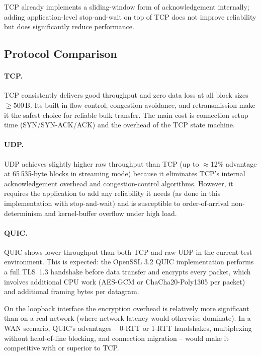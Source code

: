 \documentclass[12pt,a4paper]{article}
\begin{document}
TCP already implements a sliding-window form of acknowledgement internally;
adding application-level stop-and-wait on top of TCP does not improve
reliability but does significantly reduce performance.

\subsection{Protocol Comparison}

\paragraph{TCP.}
TCP consistently delivers good throughput and zero data loss at all block
sizes $\geq 500$\,B.  Its built-in flow control, congestion avoidance, and
retransmission make it the safest choice for reliable bulk transfer.
The main cost is connection setup time (SYN/SYN-ACK/ACK) and the overhead
of the TCP state machine.

\paragraph{UDP.}
UDP achieves slightly higher raw throughput than TCP (up to $\approx$12\%
advantage at 65\,535-byte blocks in streaming mode) because it eliminates
TCP's internal acknowledgement overhead and congestion-control algorithms.
However, it requires the application to add any reliability it needs (as done
in this implementation with stop-and-wait) and is susceptible to
order-of-arrival non-determinism and kernel-buffer overflow under high load.

\paragraph{QUIC.}
QUIC shows lower throughput than both TCP and raw UDP in the current
test environment.  This is expected: the OpenSSL 3.2 QUIC implementation
performs a full TLS~1.3 handshake before data transfer and encrypts every
packet, which involves additional CPU work (AES-GCM or ChaCha20-Poly1305
per packet) and additional framing bytes per datagram.

On the loopback interface the encryption overhead is relatively more
significant than on a real network (where network latency would otherwise
dominate).  In a WAN scenario, QUIC's advantages -- 0-RTT or 1-RTT handshakes,
multiplexing without head-of-line blocking, and connection migration -- would
make it competitive with or superior to TCP.
\end{document}
